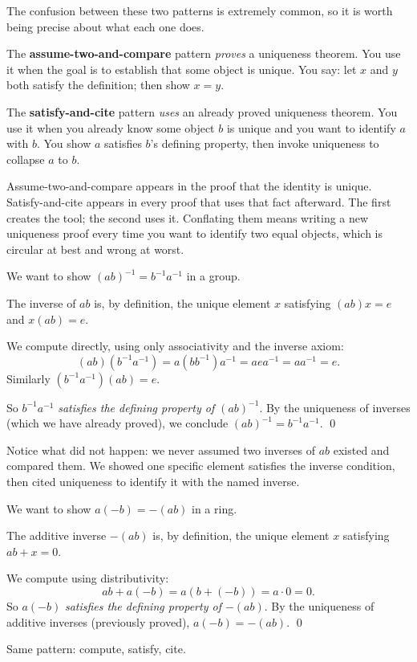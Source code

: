 \begin{remark}
The confusion between these two patterns is extremely common, so it is
worth being precise about what each one does.

The \textbf{assume-two-and-compare} pattern \emph{proves} a uniqueness
theorem. You use it when the goal is to establish that some object is
unique. You say: let $x$ and $y$ both satisfy the definition; then show
$x = y$.

The \textbf{satisfy-and-cite} pattern \emph{uses} an already proved
uniqueness theorem. You use it when you already know some object $b$
is unique and you want to identify $a$ with $b$. You show $a$ satisfies
$b$'s defining property, then invoke uniqueness to collapse $a$ to $b$.

Assume-two-and-compare appears in the proof that the identity is unique.
Satisfy-and-cite appears in every proof that uses that fact afterward.
The first creates the tool; the second uses it. Conflating them means
writing a new uniqueness proof every time you want to identify two equal
objects, which is circular at best and wrong at worst.
\end{remark}

\begin{example}[Socks-shoes property: $(ab)^{-1} = b^{-1}a^{-1}$]
We want to show $(ab)^{-1} = b^{-1}a^{-1}$ in a group.

The inverse of $ab$ is, by definition, the unique element $x$
satisfying $(ab)x = e$ and $x(ab) = e$.

We compute directly, using only associativity and the inverse axiom:
\[
(ab)(b^{-1}a^{-1})
= a(bb^{-1})a^{-1}
= a e a^{-1}
= aa^{-1} = e.
\]
Similarly $(b^{-1}a^{-1})(ab) = e$.

So $b^{-1}a^{-1}$ \emph{satisfies the defining property of $(ab)^{-1}$}.
By the uniqueness of inverses (which we have already proved), we
conclude $(ab)^{-1} = b^{-1}a^{-1}$. \qed

\medskip
\noindent
Notice what did not happen: we never assumed two inverses of $ab$ existed
and compared them. We showed one specific element satisfies the inverse
condition, then cited uniqueness to identify it with the named inverse.
\end{example}

\begin{example}[Ring theorem: $a \cdot (-b) = -(ab)$]
We want to show $a(-b) = -(ab)$ in a ring.

The additive inverse $-(ab)$ is, by definition, the unique element $x$
satisfying $ab + x = 0$.

We compute using distributivity:
\[
ab + a(-b) = a(b + (-b)) = a \cdot 0 = 0.
\]
So $a(-b)$ \emph{satisfies the defining property of $-(ab)$}.
By the uniqueness of additive inverses (previously proved), $a(-b) = -(ab)$. \qed

\medskip
\noindent Same pattern: compute, satisfy, cite.
\end{example}


